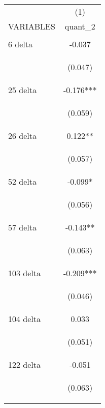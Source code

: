 \begin{center}
\begin{tabular}{lc} \hline
 & (1) \\
VARIABLES & quant\_2 \\ \hline
\vspace{4pt} & \begin{footnotesize}\end{footnotesize} \\
6 delta & -0.037 \\
\vspace{4pt} & \begin{footnotesize}(0.047)\end{footnotesize} \\
25 delta & -0.176*** \\
\vspace{4pt} & \begin{footnotesize}(0.059)\end{footnotesize} \\
26 delta & 0.122** \\
\vspace{4pt} & \begin{footnotesize}(0.057)\end{footnotesize} \\
52 delta & -0.099* \\
\vspace{4pt} & \begin{footnotesize}(0.056)\end{footnotesize} \\
57 delta & -0.143** \\
\vspace{4pt} & \begin{footnotesize}(0.063)\end{footnotesize} \\
103 delta & -0.209*** \\
\vspace{4pt} & \begin{footnotesize}(0.046)\end{footnotesize} \\
104 delta & 0.033 \\
\vspace{4pt} & \begin{footnotesize}(0.051)\end{footnotesize} \\
122 delta & -0.051 \\
\vspace{4pt} & \begin{footnotesize}(0.063)\end{footnotesize} \\

\end{tabular}
\end{center}
